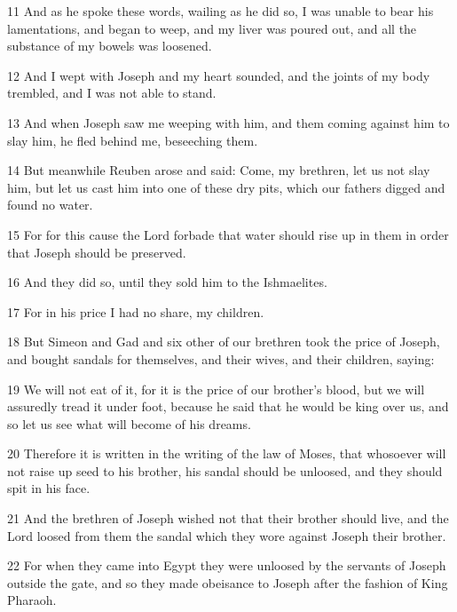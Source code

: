 \par 11 And as he spoke these words, wailing as he did so, I was unable to bear his lamentations, and began to weep, and my liver was poured out, and all the substance of my bowels was loosened.

\par 12 And I wept with Joseph and my heart sounded, and the joints of my body trembled, and I was not able to stand.

\par 13 And when Joseph saw me weeping with him, and them coming against him to slay him, he fled behind me, beseeching them.

\par 14 But meanwhile Reuben arose and said: Come, my brethren, let us not slay him, but let us cast him into one of these dry pits, which our fathers digged and found no water.

\par 15 For for this cause the Lord forbade that water should rise up in them in order that Joseph should be preserved.

\par 16 And they did so, until they sold him to the Ishmaelites.

\par 17 For in his price I had no share, my children.

\par 18 But Simeon and Gad and six other of our brethren took the price of Joseph, and bought sandals for themselves, and their wives, and their children, saying:

\par 19 We will not eat of it, for it is the price of our brother's blood, but we will assuredly tread it under foot, because he said that he would be king over us, and so let us see what will become of his dreams.

\par 20 Therefore it is written in the writing of the law of Moses, that whosoever will not raise up seed to his brother, his sandal should be unloosed, and they should spit in his face.

\par 21 And the brethren of Joseph wished not that their brother should live, and the Lord loosed from them the sandal which they wore against Joseph their brother.

\par 22 For when they came into Egypt they were unloosed by the servants of Joseph outside the gate, and so they made obeisance to Joseph after the fashion of King Pharaoh.

